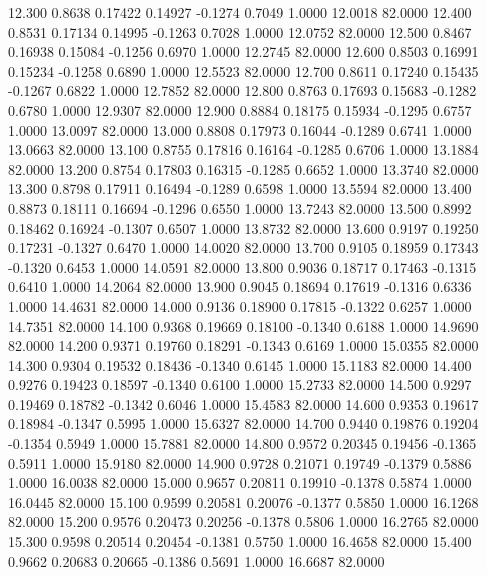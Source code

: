   12.300   0.8638   0.17422   0.14927  -0.1274   0.7049   1.0000  12.0018  82.0000
  12.400   0.8531   0.17134   0.14995  -0.1263   0.7028   1.0000  12.0752  82.0000
  12.500   0.8467   0.16938   0.15084  -0.1256   0.6970   1.0000  12.2745  82.0000
  12.600   0.8503   0.16991   0.15234  -0.1258   0.6890   1.0000  12.5523  82.0000
  12.700   0.8611   0.17240   0.15435  -0.1267   0.6822   1.0000  12.7852  82.0000
  12.800   0.8763   0.17693   0.15683  -0.1282   0.6780   1.0000  12.9307  82.0000
  12.900   0.8884   0.18175   0.15934  -0.1295   0.6757   1.0000  13.0097  82.0000
  13.000   0.8808   0.17973   0.16044  -0.1289   0.6741   1.0000  13.0663  82.0000
  13.100   0.8755   0.17816   0.16164  -0.1285   0.6706   1.0000  13.1884  82.0000
  13.200   0.8754   0.17803   0.16315  -0.1285   0.6652   1.0000  13.3740  82.0000
  13.300   0.8798   0.17911   0.16494  -0.1289   0.6598   1.0000  13.5594  82.0000
  13.400   0.8873   0.18111   0.16694  -0.1296   0.6550   1.0000  13.7243  82.0000
  13.500   0.8992   0.18462   0.16924  -0.1307   0.6507   1.0000  13.8732  82.0000
  13.600   0.9197   0.19250   0.17231  -0.1327   0.6470   1.0000  14.0020  82.0000
  13.700   0.9105   0.18959   0.17343  -0.1320   0.6453   1.0000  14.0591  82.0000
  13.800   0.9036   0.18717   0.17463  -0.1315   0.6410   1.0000  14.2064  82.0000
  13.900   0.9045   0.18694   0.17619  -0.1316   0.6336   1.0000  14.4631  82.0000
  14.000   0.9136   0.18900   0.17815  -0.1322   0.6257   1.0000  14.7351  82.0000
  14.100   0.9368   0.19669   0.18100  -0.1340   0.6188   1.0000  14.9690  82.0000
  14.200   0.9371   0.19760   0.18291  -0.1343   0.6169   1.0000  15.0355  82.0000
  14.300   0.9304   0.19532   0.18436  -0.1340   0.6145   1.0000  15.1183  82.0000
  14.400   0.9276   0.19423   0.18597  -0.1340   0.6100   1.0000  15.2733  82.0000
  14.500   0.9297   0.19469   0.18782  -0.1342   0.6046   1.0000  15.4583  82.0000
  14.600   0.9353   0.19617   0.18984  -0.1347   0.5995   1.0000  15.6327  82.0000
  14.700   0.9440   0.19876   0.19204  -0.1354   0.5949   1.0000  15.7881  82.0000
  14.800   0.9572   0.20345   0.19456  -0.1365   0.5911   1.0000  15.9180  82.0000
  14.900   0.9728   0.21071   0.19749  -0.1379   0.5886   1.0000  16.0038  82.0000
  15.000   0.9657   0.20811   0.19910  -0.1378   0.5874   1.0000  16.0445  82.0000
  15.100   0.9599   0.20581   0.20076  -0.1377   0.5850   1.0000  16.1268  82.0000
  15.200   0.9576   0.20473   0.20256  -0.1378   0.5806   1.0000  16.2765  82.0000
  15.300   0.9598   0.20514   0.20454  -0.1381   0.5750   1.0000  16.4658  82.0000
  15.400   0.9662   0.20683   0.20665  -0.1386   0.5691   1.0000  16.6687  82.0000
